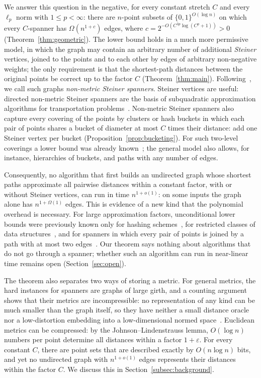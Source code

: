 \documentclass[11pt]{article}
\theoremstyle{definition}
\theoremstyle{remark}
\begin{document}
We answer this question in the negative, for every constant stretch $C$ and every $\ell_p$ norm with $1 \le p < \infty$: there are $n$-point subsets of $\{0, 1\}^{O(\log n)}$ on which every $C$-spanner has $\Omega(n^{1 + c})$ edges, where $c = 2^{-O(C^{3p}\log(C^p + 1))} > 0$ (Theorem~\ref{thm:geometric}). The lower bound holds in a much more permissive model, in which the graph may contain an arbitrary number of additional \emph{Steiner} vertices, joined to the points and to each other by edges of arbitrary non-negative weights; the only requirement is that the shortest-path distances between the original points be correct up to the factor $C$ (Theorem~\ref{thm:main}). Following~\cite{andoni2023subquadratic}, we call such graphs \emph{non-metric Steiner spanners}. Steiner vertices are useful: directed non-metric Steiner spanners are the basis of subquadratic approximation algorithms for transportation problems~\cite{andoni2023subquadratic,jayaram2026near}. Non-metric Steiner spanners also capture every covering of the points by clusters or hash buckets in which each pair of points shares a bucket of diameter at most $C$ times their distance: add one Steiner vertex per bucket (Proposition~\ref{prop:bucketing}). For such two-level coverings a lower bound was already known~\cite{krauthgamer2026towards}; the general model also allows, for instance, hierarchies of buckets, and paths with any number of edges.

Consequently, no algorithm that first builds an undirected graph whose shortest paths approximate all pairwise distances within a constant factor, with or without Steiner vertices, can run in time $n^{1 + o(1)}$: on some inputs the graph alone has $n^{1 + \Omega(1)}$ edges. This is evidence of a new kind that the polynomial overhead is necessary. For large approximation factors, unconditional lower bounds were previously known only for hashing schemes~\cite{motwani2007lower,odonnell2014optimal}, for restricted classes of data structures~\cite{panigrahy2010lower,andoni2017optimal}, and for spanners in which every pair of points is joined by a path with at most two edges~\cite{harpeled2013euclidean,krauthgamer2026towards}. Our theorem says nothing about algorithms that do not go through a spanner; whether such an algorithm can run in near-linear time remains open (Section~\ref{sec:open}).

The theorem also separates two ways of storing a metric. For general metrics, the hard instances for spanners are graphs of large girth, and a counting argument shows that their metrics are incompressible: no representation of any kind can be much smaller than the graph itself, so they have neither a small distance oracle nor a low-distortion embedding into a low-dimensional normed space~\cite{thorup2005approximate,matousek1996distortion}. Euclidean metrics can be compressed: by the Johnson--Lindenstrauss lemma, $O(\log n)$ numbers per point determine all distances within a factor $1 + \varepsilon$. For every constant $C$, there are point sets that are described exactly by $O(n \log n)$ bits, and yet no undirected graph with $n^{1 + o(1)}$ edges represents their distances within the factor $C$. We discuss this in Section~\ref{subsec:background}.
\end{document}
